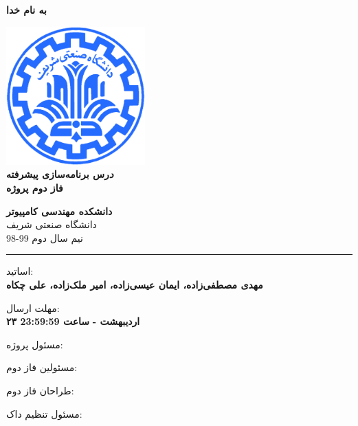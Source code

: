 \documentclass[]{article}
\begin{document}
\begin{titlepage}
\begin{center}

\textbf{ \Huge{به نام خدا} }
        
\vspace{0.2cm}

\includegraphics[width=0.4\textwidth]{sharif1.png}\\
\vspace{0.2cm}
\textbf{ \Huge{\emph درس برنامه‌سازی پیشرفته} }\\
\vspace{0.25cm}
\textbf{ \Large{ فاز دوم پروژه} }
\vspace{0.2cm}
       
 
      \large \textbf{دانشکده مهندسی کامپیوتر}\\\vspace{0.1cm}
    \large   دانشگاه صنعتی شریف\\\vspace{0.2cm}
       \large   ﻧﯿﻢ سال دوم 99-98 \\\vspace{0.10cm}
      \noindent\rule[1ex]{\linewidth}{1pt}
اساتید:\\
    \textbf{{مهدی مصطفی‌زاده، ایمان عیسی‌زاده، امیر ملک‌زاده، علی چکاه}}



    \vspace{0.20cm}

   مهلت ارسال:\\
    \textbf{{۲۳ اردیبهشت - }}
    \textbf{{ساعت 23:59:59}}

    \vspace{0.10cm}
مسئول پروژه:\\
    \textbf{}
    
        \vspace{0.10cm}
مسئولین فاز دوم:\\
    \textbf{}
    
        \vspace{0.10cm}
طراحان فاز دوم:\\
    \textbf{}
    
        \vspace{0.05cm}
مسئول تنظیم داک:\\
    \textbf{}
    

\end{center}
\end{titlepage}
\end{document}
